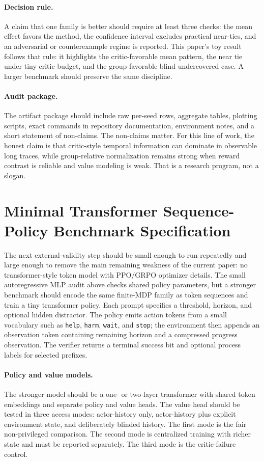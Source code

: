 \documentclass[11pt]{article}
\begin{document}
\paragraph{Decision rule.}
A claim that one family is better should require at least three checks:
the mean effect favors the method, the confidence interval excludes practical
near-ties, and an adversarial or counterexample regime is reported. This paper's
toy result follows that rule: it highlights the critic-favorable mean pattern,
the near tie under tiny critic budget, and the group-favorable blind
undercovered case. A larger benchmark should preserve the same discipline.

\paragraph{Audit package.}
The artifact package should include raw per-seed rows, aggregate tables,
plotting scripts, exact commands in repository documentation, environment
notes, and a short statement of non-claims. The non-claims matter. For this
line of work, the honest claim is that
critic-style temporal information can dominate in observable long traces, while
group-relative normalization remains strong when reward contrast is reliable
and value modeling is weak. That is a research program, not a slogan.

\section{Minimal Transformer Sequence-Policy Benchmark Specification}

The next external-validity step should be small enough to run repeatedly and
large enough to remove the main remaining weakness of the current paper: no
transformer-style token model with PPO/GRPO optimizer details. The small
autoregressive MLP audit above checks shared policy parameters, but a stronger
benchmark should encode the same finite-MDP family as token sequences and train
a tiny transformer policy. Each prompt specifies a
threshold, horizon, and optional hidden distractor. The policy emits action
tokens from a small vocabulary such as \texttt{help}, \texttt{harm},
\texttt{wait}, and \texttt{stop}; the environment then appends an observation
token containing remaining horizon and a compressed progress observation. The
verifier returns a terminal success bit and optional process labels for selected
prefixes.

\paragraph{Policy and value models.}
The stronger model should be a one- or two-layer transformer with shared token
embeddings and separate policy and value heads. The value head should be tested
in three access modes: actor-history only, actor-history plus explicit
environment state, and deliberately blinded history. The first mode is the fair
non-privileged comparison. The second mode is centralized training with richer
state and must be reported separately. The third mode is the critic-failure
control.
\end{document}
